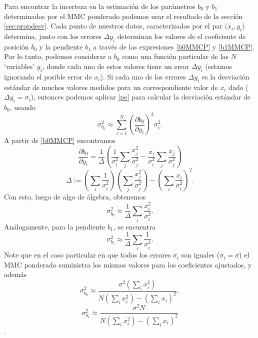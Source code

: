 Para encontrar la incerteza en la estimación de los parámetros $b_0$ y $b_1$ determinados por el MMC ponderado podemos usar el resultado de la sección \ref{sec:propdesv}. Cada punto de nuestros datos, caracterizados por el par $(x_i,y_i$) determina, junto con los errores $\Delta y_i$ determinan los valores de el coeficiente de posición $b_0$ y la pendiente $b_1$ a través de las expresiones \ref{b0MMCP} y \ref{b1MMCP}. Por lo tanto, podemos considerar a $b_0$ como una función particular de las $N$ `variables' $y_i$, donde cada uno de estos valores tiene un error $\Delta y_i$ (estamos ignorando el posible error de $x_i$). Si cada uno de los errores $\Delta y_i$ es la desviación estándar de muchos valores medidos para un correspondiente valor de $x_i$ dado ($\Delta y_i=\sigma_i$), entonces podemos aplicar \ref{pe} para calcular la desviación estándar de $b_0$, usando
\begin{equation}
\sigma_{b_0}^2\approx\sum_{i=1}^N\left(\frac{\partial b_0}{\partial y_i}\right)^2\sigma_i^2.
\end{equation}
A partir de \ref{b0MMCP} encontramos
\begin{equation}
\frac{\partial b_0}{\partial y_i}=\frac{1}{\Delta}\left(\frac{1}{\sigma_i^2}\sum_j\frac{x_j^2}{\sigma_j^2}-\frac{x_i}{\sigma_i^2}\sum_j\frac{x_j}{\sigma_j^2}\right)
\end{equation}
\begin{equation}
\Delta:=\left(\sum_i\frac{1}{\sigma_i^2}\right)\left(\sum_j\frac{x_j^2}{\sigma_j^2}\right)-\left(\sum_i\frac{x_i}{\sigma_i^2}\right)^2.
\end{equation}
Con esto, luego de algo de álgebra, obtenemos
\begin{equation}
\sigma_{b_0}^2\approx \frac{1}{\Delta}\sum_i\frac{x_i^2}{\sigma_i^2}.
\end{equation}
Análogamente, para la pendiente $b_1$, se encuentra
\begin{equation}
\sigma_{b_1}^2\approx \frac{1}{\Delta}\sum_i\frac{1}{\sigma_i^2}.
\end{equation}
Note que en el caso particular en que todos los errores $\sigma_i$ son iguales ($\sigma_i=\sigma$) el MMC ponderado suministra los mismos valores para los coeficientes ajustados, y además
\begin{equation}
\sigma_{b_0}^2\approx \frac{\sigma^2\left(\sum_i x_i^2\right)}{N\left(\sum_i x_i^2\right)-\left(\sum_i x_i\right)^2},
\end{equation}
\begin{equation}
\sigma_{b_1}^2\approx \frac{\sigma^2N}{N\left(\sum_i x_i^2\right)-\left(\sum_i x_i\right)^2}
\end{equation}.
